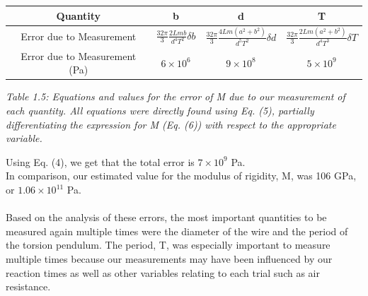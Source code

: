\documentclass[leqno]{article}
\begin{document}
\begin{tabular}{|c|c|c|c|}
\hline
Quantity & b & d & T\\
\hline
Error due to Measurement & $\frac{32\pi}{3}\frac{2Lmb}{d^4 T^2}\delta b$ & $\frac{32\pi}{3}\frac{4Lm(a^2+b^2)}{d^5 T^2}\delta d$ & $\frac{32\pi}{3}\frac{2Lm(a^2+b^2)}{d^4 T^3}\delta T$\\
\hline
Error due to Measurement (Pa)& $6\times10^6$ & $9\times10^8$ & $5\times10^9$\\
\hline
\end{tabular}
\begin{flushleft}
\textit{\small Table 1.5: Equations and values for the error of M due to our measurement of each quantity.  All equations were directly found using Eq. (5), partially differentiating the expression for M (Eq. (6)) with respect to the appropriate variable.}
\end{flushleft}
Using Eq. (4), we get that the total error is $7 \times 10^9$ Pa.\\
In comparison, our estimated value for the modulus of rigidity, M, was 106 GPa, or $1.06\times10^{11}$ Pa.\\\\
Based on the analysis of these errors, the most important quantities to be measured again multiple times were the diameter of the wire and the period of the torsion pendulum.  The period, T, was especially important to measure multiple times because our measurements may have been influenced by our reaction times as well as other variables relating to each trial such as air resistance.
\end{document}
